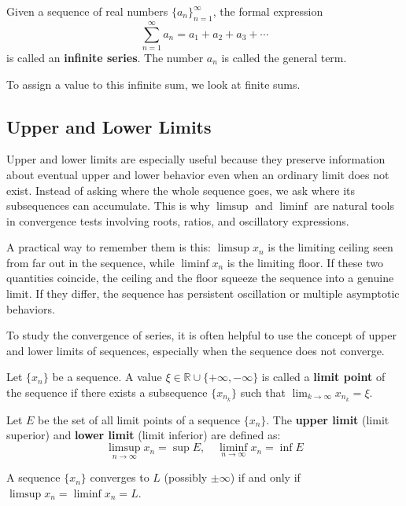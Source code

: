 \begin{definition}
Given a sequence of real numbers $\{a_n\}_{n=1}^{\infty}$, the formal expression
\[ \sum_{n=1}^{\infty} a_n = a_1 + a_2 + a_3 + \cdots \]
is called an \textbf{infinite series}. The number $a_n$ is called the general term.
\end{definition}

To assign a value to this infinite sum, we look at finite sums.

\subsection{Upper and Lower Limits}


Upper and lower limits are especially useful because they preserve information about eventual upper and lower behavior even when an ordinary limit does not exist. Instead of asking where the whole sequence goes, we ask where its subsequences can accumulate. This is why $\limsup$ and $\liminf$ are natural tools in convergence tests involving roots, ratios, and oscillatory expressions.

A practical way to remember them is this: $\limsup x_n$ is the limiting ceiling seen from far out in the sequence, while $\liminf x_n$ is the limiting floor. If these two quantities coincide, the ceiling and the floor squeeze the sequence into a genuine limit. If they differ, the sequence has persistent oscillation or multiple asymptotic behaviors.

To study the convergence of series, it is often helpful to use the concept of upper and lower limits of sequences, especially when the sequence does not converge.

\begin{definition}
Let $\{x_n\}$ be a sequence. A value $\xi \in \mathbb{R} \cup \{+\infty, -\infty\}$ is called a \textbf{limit point} of the sequence if there exists a subsequence $\{x_{n_k}\}$ such that $\lim_{k \to \infty} x_{n_k} = \xi$.
\end{definition}

\begin{definition}
Let $E$ be the set of all limit points of a sequence $\{x_n\}$. The \textbf{upper limit} (limit superior) and \textbf{lower limit} (limit inferior) are defined as:
\[ \limsup_{n \to \infty} x_n = \sup E, \quad \liminf_{n \to \infty} x_n = \inf E \]
\end{definition}

\begin{theorem}
A sequence $\{x_n\}$ converges to $L$ (possibly $\pm \infty$) if and only if $\limsup x_n = \liminf x_n = L$.
\end{theorem}

